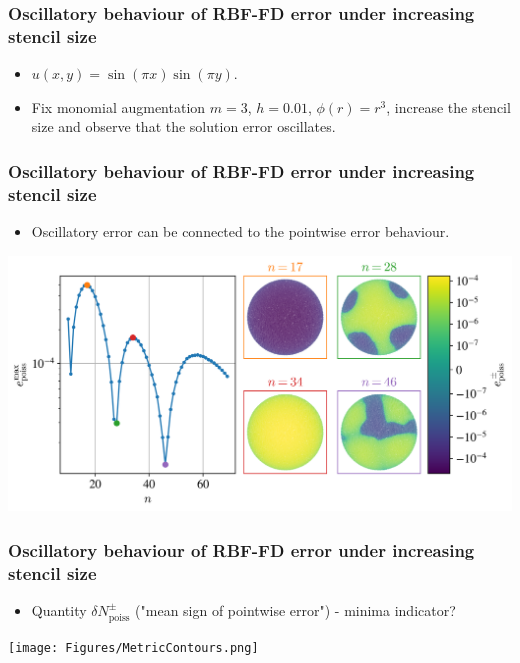 \documentclass{beamer}
\begin{document}
\begin{frame}
\frametitle{Oscillatory behaviour of RBF-FD error under increasing stencil size}
\begin{itemize}
\item<1-> $u(x,y) = \sin (\pi x) \sin (\pi y)$.
\item<2-> Fix monomial augmentation $m=3$, $h=0.01$, $\phi(r) = r^3$, increase the stencil size and observe that the solution error oscillates.
\end{itemize}
\end{frame}
\begin{frame}
\frametitle{Oscillatory behaviour of RBF-FD error under increasing stencil size}
\begin{itemize}
\item Oscillatory error can be connected to the pointwise error behaviour.
\end{itemize}
\includegraphics[width=.8\linewidth,center]{Figures/PlotWithContours.png}
\end{frame}

\begin{frame}
\frametitle{Oscillatory behaviour of RBF-FD error under increasing stencil size}
\begin{itemize}
\item Quantity $\delta N_\mathrm{poiss}^\pm$ ("mean sign of pointwise error") - minima indicator?
\end{itemize}
\texttt{[image: Figures/MetricContours.png]}
\end{frame}
\end{document}
